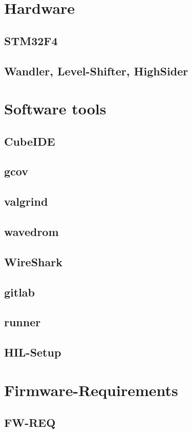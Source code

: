 \documentclass[master,english,smartquotes,apa]{hgbthesis}
\begin{document}
		\section{Hardware}
			\subsection{STM32F4}
			\subsection{Wandler, Level-Shifter, HighSider}

		\section{Software tools}
			\subsection{CubeIDE}
			\subsection{gcov}
			\subsection{valgrind}
			\subsection{wavedrom}
			\subsection{WireShark}
			\subsection{gitlab}
			\subsection{runner}
			\subsection{HIL-Setup}
			
		\section{Firmware-Requirements}
			\subsection{FW-REQ}
\end{document}
